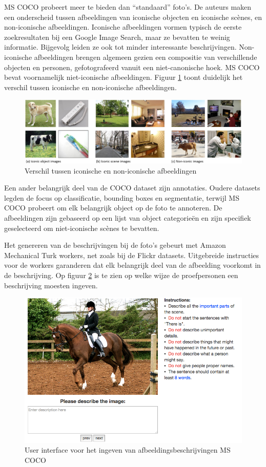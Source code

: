 MS COCO probeert meer te bieden dan ``standaard'' foto's. De auteurs maken een onderscheid tussen afbeeldingen van iconische objecten en iconische sc\`enes, en non-iconische afbeeldingen. Iconische afbeeldingen vormen typisch de eerste zoekresultaten bij een Google Image Search, maar ze bevatten te weinig informatie. Bijgevolg leiden ze ook tot minder interessante beschrijvingen. Non-iconische afbeeldingen brengen algemeen gezien een compositie van verschillende objecten en personen, gefotografeerd vanuit een niet-canonische hoek. MS COCO bevat voornamelijk niet-iconische afbeeldingen. Figuur \ref{fig:cocotypes} toont duidelijk het verschil tussen iconische en non-iconische afbeeldingen.

\begin{figure}[tb]
    \centering
    \includegraphics[width=\linewidth]{Images/iconic.jpg}
    \caption{Verschil tussen iconische en non-iconische afbeeldingen}
    \label{fig:cocotypes}
\end{figure}

Een ander belangrijk deel van de COCO dataset zijn annotaties. Oudere datasets legden de focus op classificatie, bounding boxes en segmentatie, terwijl MS COCO probeert om elk belangrijk object op de foto te annoteren. De afbeeldingen zijn gebaseerd op een lijst van object categorie\"en en zijn specifiek geselecteerd om niet-iconische sc\`enes te bevatten.

Het genereren van de beschrijvingen bij de foto's gebeurt met Amazon Mechanical Turk workers, net zoals bij de Flickr datasets. Uitgebreide instructies voor de workers garanderen dat elk belangrijk deel van de afbeelding voorkomt in de beschrijving.  Op figuur \ref{fig:coco_ui} is te zien op welke wijze de proefpersonen een beschrijving moesten ingeven.


\begin{figure}[tb]
    \centering
    \includegraphics[width=0.8\linewidth]{Images/coco_UI.png}
    \caption{User interface voor het ingeven van afbeeldingsbeschrijvingen MS COCO}
    \label{fig:coco_ui}
\end{figure}
